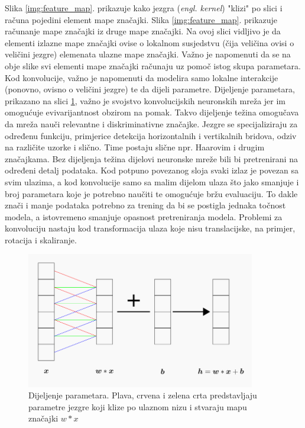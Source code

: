 Slika \ref{img:feature_map}. prikazuje kako jezgra (\textit{engl. kernel}) "klizi" po slici i računa pojedini element mape značajki. Slika \ref{img:feature_map}. prikazuje računanje mape značajki iz druge mape značajki. Na ovoj slici vidljivo je da elementi izlazne mape značajki ovise o lokalnom susjedstvu (čija veličina ovisi o veličini jezgre) elemenata ulazne mape značajki. Važno je napomenuti da se na obje slike svi elementi mape značajki računaju uz pomoč istog skupa parametara. 
Kod konvolucije, važno je napomenuti da modelira samo lokalne interakcije (ponovno, ovisno o veličini jezgre) te da dijeli parametre. Dijeljenje parametara, prikazano na slici \ref{img:param_sharing}, važno je svojstvo konvolucijskih neuronskih mreža jer im omogućuje evivarijantnost obzirom na pomak. Takvo dijeljenje težina omogučava da mreža nauči relevantne i diskriminativne značajke. Jezgre se specijaliziraju za određenu funkciju, primjerice detekcija horizontalnih i vertikalnih bridova, odziv na različite uzorke i slično. Time postaju slične npr. Haarovim i drugim značajkama. Bez dijeljenja težina dijelovi neuronske mreže bili bi pretrenirani na određeni detalj podataka. Kod potpuno povezanog sloja svaki izlaz je povezan sa svim ulazima, a kod konvolucije samo sa malim dijelom ulaza što jako smanjuje i broj parametara koje je potrebno naučiti te omogućuje bržu evaluaciju. To dakle znači i manje podataka potrebno za trening da bi se postigla jednaka točnost modela, a istovremeno smanjuje opasnost pretreniranja modela. Problemi za konvoluciju nastaju kod transformacija ulaza koje nisu translacijske, na primjer, rotacija i skaliranje.

\begin{figure}[htb]
\centering
\includegraphics[width=10cm]{img/ParameterSharing.png}
\caption{Dijeljenje parametara. Plava, crvena i zelena crta predstavljaju parametre jezgre koji klize po ulaznom nizu i stvaraju mapu značajki $w * x$}
\label{img:param_sharing}
\end{figure}

